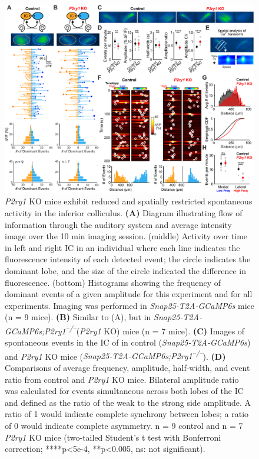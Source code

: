 \documentclass[9pt,lineno]{elife}
\begin{document}
\begin{figure}
\begin{fullwidth}
\includegraphics[width=.95\linewidth]{figures/Fig7.pdf}
\caption{\textit{P2ry1} KO mice exhibit reduced and spatially restricted spontaneous activity in the inferior colliculus.
\textbf{(A)} Diagram illustrating flow of information through the auditory system and average intensity image over the 10 min imaging session. (middle) Activity over time in left and right IC in an individual where each line indicates the fluorescence intensity of each detected event; the circle indicates the dominant lobe, and the size of the circle indicated the difference in fluorescence. (bottom) Histograms showing the frequency of dominant events of a given amplitude for this experiment and for all experiments. Imaging was performed in \textit{Snap25-T2A-GCaMP6s} mice (n = 9 mice).
\textbf{(B)} Similar to (A), but in \textit{Snap25-T2A-GCaMP6s;P2ry1\textsuperscript{–/–}}(\textit{P2ry1} KO) mice (n = 7 mice).
\textbf{(C)} Images of spontaneous events in the IC of in control (\textit{Snap25-T2A-GCaMP6s}) and \textit{P2ry1} KO mice (\textit{Snap25-T2A-GCaMP6s;P2ry1\textsuperscript{–/–}}).
\textbf{(D)} Comparisons of average frequency, amplitude, half-width, and event ratio from control and \textit{P2ry1} KO mice. Bilateral amplitude ratio was calculated for events simultaneous across both lobes of the IC and defined as the ratio of the weak to the strong side amplitude. A ratio of 1 would indicate complete synchrony between lobes; a ratio of 0 would indicate complete asymmetry. n = 9 control and n = 7 \textit{P2ry1} KO mice (two-tailed Student’s t test with Bonferroni correction; ****p<5e-4, **p<0.005, ns: not significant).
}
\end{fullwidth}
\end{figure}
\end{document}
